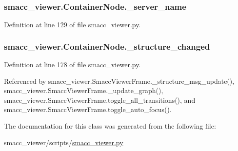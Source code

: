 \subsubsection[{\texorpdfstring{\+\_\+server\+\_\+name}{_server_name}}]{\setlength{\rightskip}{0pt plus 5cm}smacc\+\_\+viewer.\+Container\+Node.\+\_\+server\+\_\+name\hspace{0.3cm}{\ttfamily [private]}}\hypertarget{classsmacc__viewer_1_1ContainerNode_aac5daf1b3edc6c4fad17b72a6e491066}{}\label{classsmacc__viewer_1_1ContainerNode_aac5daf1b3edc6c4fad17b72a6e491066}


Definition at line 129 of file smacc\+\_\+viewer.\+py.

\subsubsection[{\texorpdfstring{\+\_\+structure\+\_\+changed}{_structure_changed}}]{\setlength{\rightskip}{0pt plus 5cm}smacc\+\_\+viewer.\+Container\+Node.\+\_\+structure\+\_\+changed\hspace{0.3cm}{\ttfamily [private]}}\hypertarget{classsmacc__viewer_1_1ContainerNode_a8d17a3a75ce519ef442b9bc94a801130}{}\label{classsmacc__viewer_1_1ContainerNode_a8d17a3a75ce519ef442b9bc94a801130}


Definition at line 178 of file smacc\+\_\+viewer.\+py.



Referenced by smacc\+\_\+viewer.\+Smacc\+Viewer\+Frame.\+\_\+structure\+\_\+msg\+\_\+update(), smacc\+\_\+viewer.\+Smacc\+Viewer\+Frame.\+\_\+update\+\_\+graph(), smacc\+\_\+viewer.\+Smacc\+Viewer\+Frame.\+toggle\+\_\+all\+\_\+transitions(), and smacc\+\_\+viewer.\+Smacc\+Viewer\+Frame.\+toggle\+\_\+auto\+\_\+focus().



The documentation for this class was generated from the following file\+:\begin{DoxyCompactItemize}
\item 
smacc\+\_\+viewer/scripts/\hyperlink{smacc__viewer_8py}{smacc\+\_\+viewer.\+py}\end{DoxyCompactItemize}
